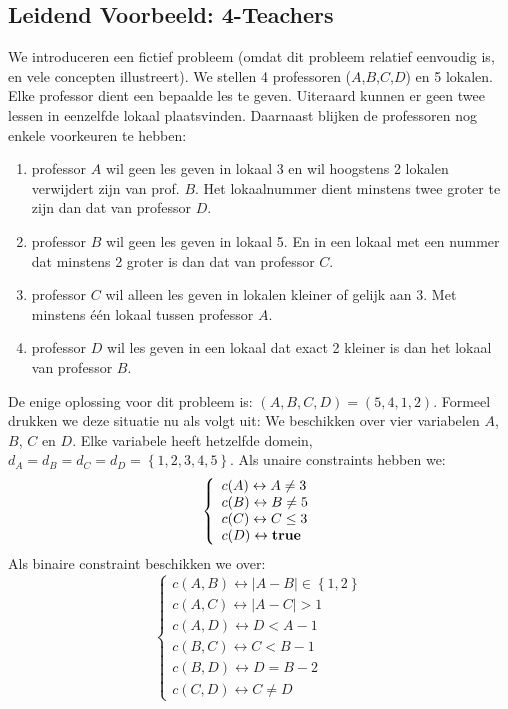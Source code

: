\subsection{Leidend Voorbeeld: 4-Teachers}
\begin{leftbar}
We introduceren een fictief probleem (omdat dit probleem relatief eenvoudig is, en vele concepten illustreert). We stellen 4 professoren ($A$,$B$,$C$,$D$) en 5 lokalen. Elke professor dient een bepaalde les te geven. Uiteraard kunnen er geen twee lessen in eenzelfde lokaal plaatsvinden. Daarnaast blijken de professoren nog enkele voorkeuren te hebben:
\begin{enumerate}
 \item professor $A$ wil geen les geven in lokaal 3 en wil hoogstens 2 lokalen verwijdert zijn van prof. $B$. Het lokaalnummer dient minstens twee groter te zijn dan dat van professor $D$.
 \item professor $B$ wil geen les geven in lokaal 5. En in een lokaal met een nummer dat minstens 2 groter is dan dat van professor $C$.
 \item professor $C$ wil alleen les geven in lokalen kleiner of gelijk aan 3. Met minstens één lokaal tussen professor $A$.
 \item professor $D$ wil les geven in een lokaal dat exact 2 kleiner is dan het lokaal van professor $B$.
\end{enumerate}
De enige oplossing voor dit probleem is: $\left(A,B,C,D\right)=\left(5,4,1,2\right)$. Formeel drukken we deze situatie nu als volgt uit: We beschikken over vier variabelen $A$, $B$, $C$ en $D$. Elke variabele heeft hetzelfde domein, $d_A=d_B=d_C=d_D=\left\{1,2,3,4,5\right\}$. Als unaire constraints hebben we:
\begin{equation}
\left\{\begin{array}{l}
c(A)\leftrightarrow A\neq 3\\
c(B)\leftrightarrow B\neq 5\\
c(C)\leftrightarrow C\leq 3\\
c(D)\leftrightarrow \mbox{\bf true}
\end{array}\right.
\end{equation}
Als binaire constraint beschikken we over:
\begin{equation}
\left\{\begin{array}{l}
c(A,B)\leftrightarrow\left|A-B\right|\in\left\{1,2\right\}\\
c(A,C)\leftrightarrow\left|A-C\right|>1\\
c(A,D)\leftrightarrow D<A-1\\
c(B,C)\leftrightarrow C<B-1\\
c(B,D)\leftrightarrow D=B-2\\
c(C,D)\leftrightarrow C\neq D
\end{array}\right.
\end{equation}
\end{leftbar}
